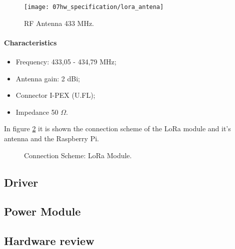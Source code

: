 \begin{figure}[H]
	\centering
	\texttt{[image: 07hw\_specification/lora\_antena]}
	\caption{RF Antenna 433 MHz.}
	\label{fig:lora_antena}
\end{figure}

\paragraph*{Characteristics}
\begin{itemize}
	\item Frequency: 433,05 - 434,79 MHz;
	\item Antenna gain: 2 dBi;
	\item Connector I-PEX (U.FL);
	\item Impedance 50 $\Omega$.
\end{itemize}

In figure \ref{fig:connect_lora} it is shown the connection scheme of the LoRa module and it's antenna and the Raspberry Pi.

\begin{figure}[H]
	\centering
	\caption{Connection Scheme: LoRa Module.}
	\label{fig:connect_lora}
\end{figure}
\subsection{Driver}

\subsection{Power Module}

\subsection{Hardware review} %
